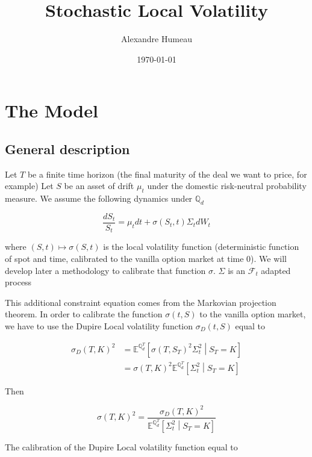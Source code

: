 \documentclass{article}
\begin{document}
\title{Stochastic Local Volatility}
\author{Alexandre Humeau}
\date{\today}
\maketitle

\section{The Model}
\subsection{General description}
Let $T$ be a finite time horizon (the final maturity of the deal we want to price, for example)
Let $S$ be an asset of drift $\mu_t$ under the domestic risk-neutral probability measure. We assume the following dynamics under $\mathbb{Q}_d$

\begin{equation}
	\frac{dS_t}{S_t} = \mu_t dt + \sigma(S_t,t) \Sigma_t dW_t
\end{equation}

\noindent where $(S,t) \mapsto \sigma(S,t)$ is the local volatility function (deterministic function of spot and time, calibrated to the vanilla option market at time $0$). We will develop later a methodology to calibrate that function $\sigma$. $\Sigma$ is an $\mathcal{F}_t$ adapted process

\noindent This additional constraint equation comes from the Markovian projection theorem. In order to calibrate the function $\sigma(t,S)$ to the vanilla option market, we have to use the Dupire Local volatility function $\sigma_D(t,S)$ equal to 

\begin{equation}
	\begin{aligned}
		\sigma_D(T,K)^2 &= \mathbb{E}^{\mathbb{Q}_d^T}\left[\sigma(T,S_T)^2 \Sigma_t^2\middle|S_T=K\right]\\
		&= \sigma(T,K)^2 \mathbb{E}^{\mathbb{Q}_d^T}\left[\Sigma_t^2\middle| S_T= K \right]
	\end{aligned}
\end{equation}

\noindent Then

\begin{equation}
	\sigma(T,K)^2 = \frac{\sigma_D(T,K)^2}{\mathbb{E}^{\mathbb{Q}_d^T}\left[\Sigma^2_t\middle| S_T= K \right]}
\end{equation}

\noindent The calibration of the Dupire Local volatility function equal to 
\end{document}
